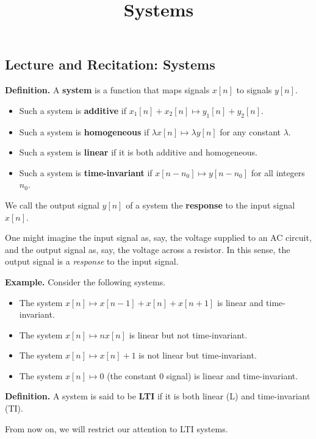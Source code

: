 \title{Systems}



\subsection{Lecture and Recitation: Systems}

\textbf{Definition.} A \textbf{system} is a function
that maps signals $x[n]$ to signals $y[n]$.
\begin{itemize}
    \item Such a system is \textbf{additive} if
    $x_1[n] + x_2[n] \mapsto y_1[n] + y_2[n]$.
    \item Such a system  is \textbf{homogeneous} if
    $\lambda x[n] \mapsto \lambda y[n]$ for any constant $\lambda$.
    \item Such a system  is \textbf{linear} if
    it is both additive and homogeneous.
    \item Such a system  is \textbf{time-invariant} if
    $x[n - n_0] \mapsto y[n - n_0]$ for all integers $n_0$.
\end{itemize}

\begin{remark}
    We call the output signal $y[n]$ of a system
    the \textbf{response} to the input signal $x[n]$.

    One might imagine the input signal as, say,
    the voltage supplied to an AC circuit,
    and the output signal as, say,
    the voltage across a resistor.
    In this sense,
    the output signal is a \emph{response}
    to the input signal.
\end{remark}

\textbf{Example.} Consider the following systems.
\begin{itemize}
    \item The system $x[n] \mapsto x[n - 1] + x[n] + x[n + 1]$
    is linear and time-invariant.
    \item The system $x[n] \mapsto nx[n]$
    is linear but not time-invariant.
    \item The system $x[n] \mapsto x[n] + 1$
    is not linear but time-invariant.
    \item The system $x[n] \mapsto 0$ (the constant $0$ signal)
    is linear and time-invariant.
\end{itemize}

\textbf{Definition.} A system is said to be \textbf{LTI}
if it is both linear (L) and time-invariant (TI).

From now on, we will restrict our attention to LTI systems.

